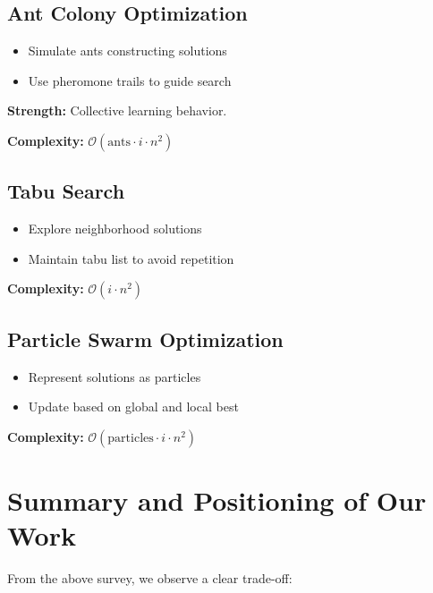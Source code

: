 \documentclass[10pt,a4paper]{report}
\theoremstyle{definition}
\newcommand{\bigO}[1]{\mathcal{O}\!\left(#1\right)}
\begin{document}
\subsection{Ant Colony Optimization}

\begin{itemize}
  \item Simulate ants constructing solutions
  \item Use pheromone trails to guide search
\end{itemize}

\textbf{Strength:} Collective learning behavior.

\textbf{Complexity:} $\bigO{\text{ants} \cdot i \cdot n^2}$

\subsection{Tabu Search}

\begin{itemize}
  \item Explore neighborhood solutions
  \item Maintain tabu list to avoid repetition
\end{itemize}

\textbf{Complexity:} $\bigO{i \cdot n^2}$

\subsection{Particle Swarm Optimization}

\begin{itemize}
  \item Represent solutions as particles
  \item Update based on global and local best
\end{itemize}

\textbf{Complexity:} $\bigO{\text{particles} \cdot i \cdot n^2}$

\section{Summary and Positioning of Our Work}

From the above survey, we observe a clear trade-off:
\end{document}
